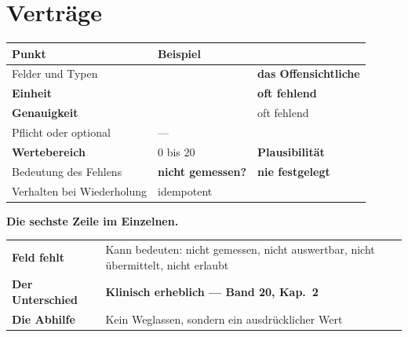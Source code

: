 \chapter{Verträge}\label{kap:vertraege}

\begin{merksatz}
\begin{center}
{\small
\renewcommand{\arraystretch}{1.5}
\begin{tabular}{@{}P{3.0cm}P{2.6cm}P{2.4cm}@{}}
\toprule
\textbf{Punkt} & \textbf{Beispiel} & \\
\midrule
Felder und Typen &  & \textbf{das Offensichtliche}\\
\textbf{Einheit} &  & \textcolor{akzent}{\textbf{oft fehlend}}\\
\textbf{Genauigkeit} &  & \textcolor{akzent}{oft fehlend}\\
Pflicht oder optional & --- & \\
\textbf{Wertebereich} & $0$ bis $20$ & \textcolor{gruen}{\textbf{Plausibilität}}\\
Bedeutung des Fehlens & \textbf{nicht gemessen?} & \textcolor{akzent}{\textbf{nie festgelegt}}\\
Verhalten bei Wiederholung & idempotent & \\
\bottomrule
\end{tabular}}
\end{center}

\begin{center}
\begin{minipage}{0.88\textwidth}
\end{minipage}
\end{center}

\textbf{Die sechste Zeile im Einzelnen.}

\begin{center}
\renewcommand{\arraystretch}{1.5}
\begin{tabular}{@{}P{2.4cm}P{6.4cm}@{}}
\toprule
\textbf{Feld fehlt} & Kann bedeuten: nicht gemessen, nicht auswertbar, nicht übermittelt, nicht erlaubt\\
\textbf{Der Unterschied} & \textbf{Klinisch erheblich --- Band 20, Kap.~2}\\
\textbf{Die Abhilfe} & Kein Weglassen, sondern ein ausdrücklicher Wert\\
\bottomrule
\end{tabular}
\end{center}


\end{merksatz}
